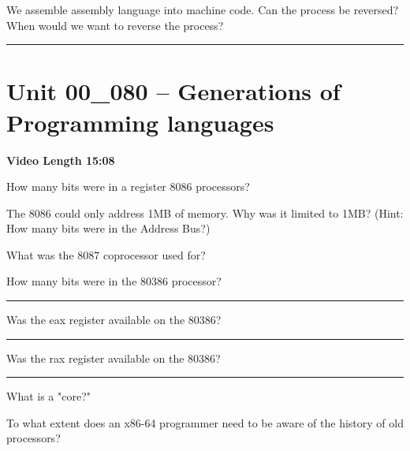 \documentclass[letterpaper,12pt]{exam}
\newcommand{\unit}{Unit 00}
\begin{document}
\begin{questions}
\begin{samepage}
     \question We assemble assembly language into machine code.  Can the process be reversed?  When would we want to reverse the process?
     \vspace{5mm}
 \end{samepage}
 

 \rule{0.5\textwidth}{.4pt} %
\section*{\unit\_080 -- Generations of Programming languages}
\par{\selectfont\textbf{Video Length 15:08}}
\begin{samepage}
    \question How many bits were in a register 8086 processors?  
    \vspace{5mm}
\end{samepage}
\begin{samepage}
    \question The 8086 could only address 1MB of memory.  Why was it limited to 1MB? (Hint: How many bits were in the Address Bus?)
    \vspace{5mm}
\end{samepage}
\par
\begin{samepage}
    \question What was the 8087 coprocessor used for?
    \vspace{5mm}
\end{samepage}


  \begin{samepage}
      \question How many bits were in the 80386 processor? \rule{1cm}{0.15mm}
        \vspace{5mm}
      \par Was the eax register available on the 80386? \rule{1cm}{0.15mm}
       \vspace{5mm}
      \par Was the rax register available on the 80386? \rule{1cm}{0.15mm}
  \end{samepage}
\begin{samepage}
    \question What is a "core?"
    \vspace{5mm}
\end{samepage}
\par
 \begin{samepage}
     \question To what extent does an x86-64 programmer need to be aware of the history of old processors?
     \vspace{5mm}
 \end{samepage}
 \par

\end{questions}
\end{document}

